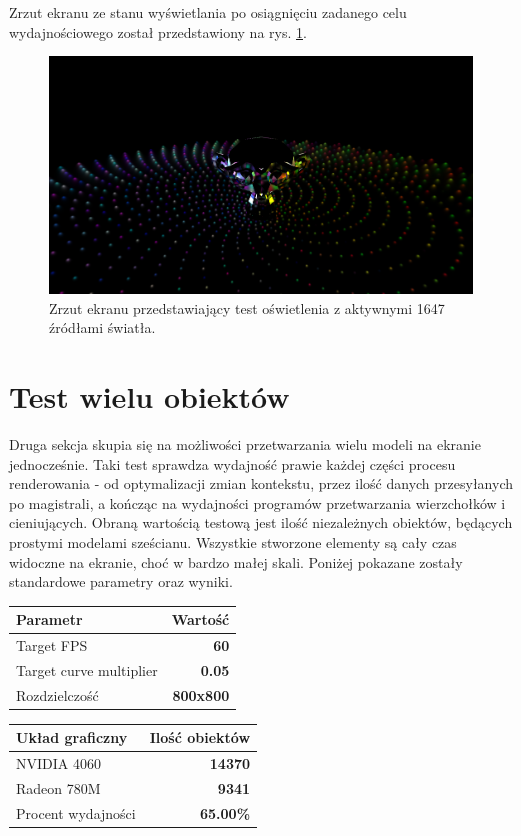 Zrzut ekranu ze stanu wyświetlania po osiągnięciu zadanego celu wydajnościowego został przedstawiony na rys. \ref{demo_test_lights}.

\vfill

\begin{figure}[h!]
	\centering
	\includegraphics[width=\textwidth]{images/demo_test_lights.png}
	\caption{Zrzut ekranu przedstawiający test oświetlenia z aktywnymi 1647 źródłami światła.}
	\label{demo_test_lights}
\end{figure}

\section{Test wielu obiektów}
\label{section_test_multilpe_objects}
Druga sekcja skupia się na możliwości przetwarzania wielu modeli na ekranie jednocześnie. Taki test sprawdza wydajność prawie każdej części procesu renderowania - od optymalizacji zmian kontekstu, przez ilość danych przesyłanych po magistrali, a kończąc na wydajności programów przetwarzania wierzchołków i cieniujących. Obraną wartością testową jest ilość niezależnych obiektów, będących prostymi modelami sześcianu. Wszystkie stworzone elementy są cały czas widoczne na ekranie, choć w bardzo małej skali. Poniżej pokazane zostały standardowe parametry oraz wyniki.

\begin{center}
	\begin{tabular}{ |l r|}
		\hline
		\textbf{Parametr} & \textbf{Wartość} \\
		\hline
		Target FPS & \textbf{60} \\
		Target curve multiplier & \textbf{0.05} \\
		Rozdzielczość & \textbf{800x800} \\
		\hline
	\end{tabular}
	\quad
	\begin{tabular}{ |l r|}
		\hline
		\textbf{Układ graficzny} & \textbf{Ilość obiektów} \\
		\hline
		NVIDIA 4060 & \textbf{14370} \\
		Radeon 780M & \textbf{9341} \\
		\hline
		Procent wydajności & \textbf{65.00\%} \\
		\hline
	\end{tabular}
\end{center}

